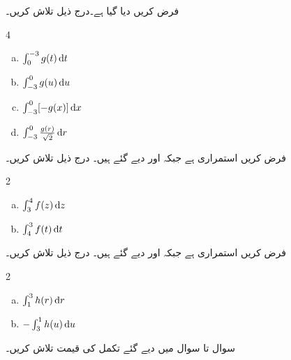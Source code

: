 فرض کریں  دیا گیا ہے۔درج ذیل تلاش کریں۔
\begin{multicols}{4}
\begin{enumerate}[a.]
\item
$\int_0^{-3}g(t)\dif t$
\item
$\int_{-3}^0g(u)\dif u$
\item
$\int_{-3}^0[-g(x)]\dif x$
\item
$\int_{-3}^0\tfrac{g(r)}{\sqrt{2}}\dif r$
\end{enumerate}
\end{multicols}
فرض کریں  استمراری ہے جبکہ   اور  دیے گئے ہیں۔ درج ذیل تلاش کریں۔
\begin{multicols}{2}
\begin{enumerate}[a.]
\item
$\int_3^4f(z)\dif z$
\item
$\int_4^3f(t)\dif t$
\end{enumerate}
\end{multicols}
فرض کریں  استمراری ہے جبکہ  اور  دیے گئے ہیں۔ درج ذیل تلاش کریں۔ 
\begin{multicols}{2}
\begin{enumerate}[a.]
\item
$\int_1^3h(r)\dif r$
\item
$-\int_3^1h(u)\dif u$
\end{enumerate}
\end{multicols}
سوال  تا سوال  میں دیے گئے  تکمل کی قیمت تلاش کریں۔

